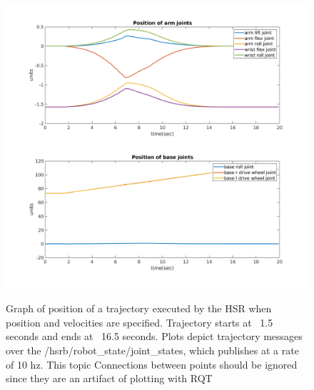\documentclass[11pt]{article}
\begin{document}
        \begin{figure}
            \centering
            \includegraphics[width=\linewidth]{2020.04.01/pos_joints.png}
            \label{fig:posjoints}
            \caption{Graph of position of a trajectory executed by the HSR when position and velocities are specified. Trajectory starts at ~1.5 seconds and ends at ~16.5 seconds. Plots depict trajectory messages over the /hsrb/robot\_state/joint\_states, which publishes at a rate of 10 hz. This topic Connections between points should be ignored since they are an artifact of plotting with RQT}
        \end{figure}
\end{document}
